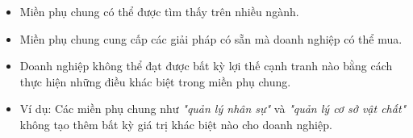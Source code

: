 \begin{itemize}

\item Miền phụ chung có thể được tìm thấy trên nhiều ngành.

\item Miền phụ chung cung cấp các giải pháp có sẵn mà doanh nghiệp có thể mua.

\item Doanh nghiệp không thể đạt được bất kỳ lợi thế cạnh tranh nào bằng cách thực hiện những điều khác biệt trong miền phụ chung.

\item Ví dụ: Các miền phụ chung như \textit{"quản lý nhân sự"} và \textit{"quản lý cơ sở vật chất"} không tạo thêm bất kỳ giá trị khác biệt nào cho doanh nghiệp.

\end{itemize}